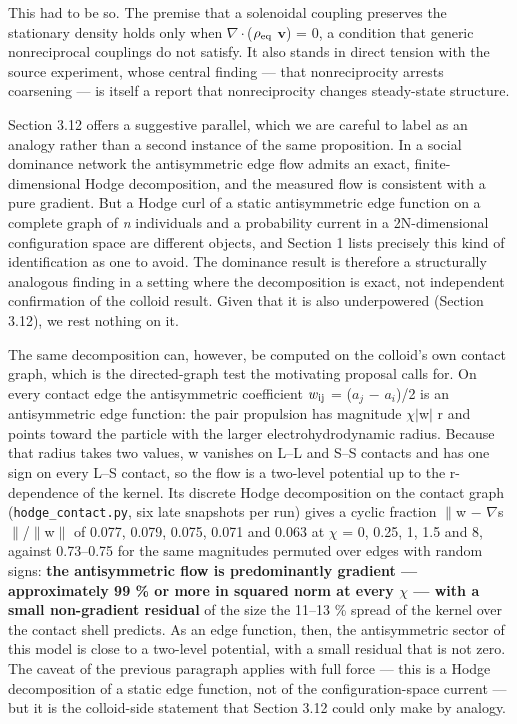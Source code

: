 \documentclass[aps,pre,preprint,superscriptaddress,nofootinbib,longbibliography]{revtex4-2}
\begin{document}
This had to be so. The premise that a solenoidal coupling preserves the stationary density holds only when $\nabla \cdot$($\rho_{\rm eq}$ $\mathbf{v}$) = 0, a condition that generic nonreciprocal couplings do not satisfy. It also stands in direct tension with the source experiment, whose central finding --- that nonreciprocity arrests coarsening --- is itself a report that nonreciprocity changes steady-state structure.

Section 3.12 offers a suggestive parallel, which we are careful to label as an analogy rather than a second instance of the same proposition. In a social dominance network the antisymmetric edge flow admits an exact, finite-dimensional Hodge decomposition, and the measured flow is consistent with a pure gradient. But a Hodge curl of a static antisymmetric edge function on a complete graph of \emph{n} individuals and a probability current in a 2N-dimensional configuration space are different objects, and Section 1 lists precisely this kind of identification as one to avoid. The dominance result is therefore a structurally analogous finding in a setting where the decomposition is exact, not independent confirmation of the colloid result. Given that it is also underpowered (Section 3.12), we rest nothing on it.

The same decomposition can, however, be computed on the colloid's own contact graph, which is the directed-graph test the motivating proposal calls for. On every contact edge the antisymmetric coefficient $w_{\rm ij}$ = ($a_{j}$ $-$ $a_{i}$)/2 is an antisymmetric edge function: the pair propulsion has magnitude $\chi |$w$|$ r and points toward the particle with the larger electrohydrodynamic radius. Because that radius takes two values, w vanishes on L--L and S--S contacts and has one sign on every L--S contact, so the flow is a two-level potential up to the r-dependence of the kernel. Its discrete Hodge decomposition on the contact graph (\texttt{hodge\_contact.py}, six late snapshots per run) gives a cyclic fraction $\|$w $-$ $\nabla$s$\|$/$\|$w$\|$ of 0.077, 0.079, 0.075, 0.071 and 0.063 at $\chi$ = 0, 0.25, 1, 1.5 and 8, against 0.73--0.75 for the same magnitudes permuted over edges with random signs: \textbf{the antisymmetric flow is predominantly gradient --- approximately 99 \% or more in squared norm at every $\chi$ --- with a small non-gradient residual} of the size the 11--13 \% spread of the kernel over the contact shell predicts. As an edge function, then, the antisymmetric sector of this model is close to a two-level potential, with a small residual that is not zero. The caveat of the previous paragraph applies with full force --- this is a Hodge decomposition of a static edge function, not of the configuration-space current --- but it is the colloid-side statement that Section 3.12 could only make by analogy.
\end{document}
